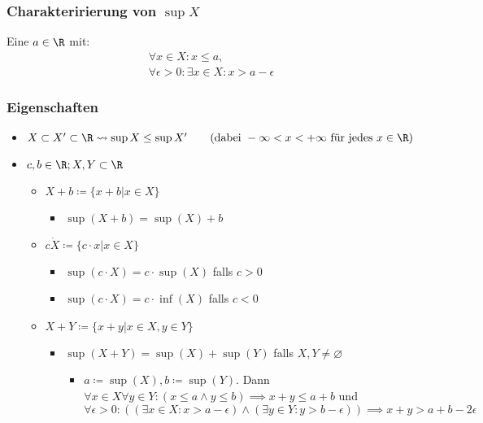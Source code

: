 \subsubsection{Charakteririerung von \texorpdfstring{$\sup X$}{sup X}}
Eine $a \in \R$ mit:\\
\begin{gather*}
	\forall x \in X : x \leq a, \\
	\forall \epsilon > 0 : \exists x \in X : x > a - \epsilon
\end{gather*}

\subsubsection{Eigenschaften}
\begin{itemize}
	\item $X \subset X' \subset \R \rightsquigarrow \sup X \leq \sup X' \qquad (\text{dabei } -\infty < x < +\infty \text{ für jedes } x \in \R )$
	\item $c, b \in \R ; X, Y \subset \R$
	\begin{itemize}
		\item $X + b \coloneqq \{ x + b | x \in X \}$
		\begin{itemize}
			\item $\sup(X + b) = \sup(X) + b$
		\end{itemize}
		\item $c \dot X \coloneqq \{ c \cdot x | x \in X \}$
		\begin{itemize}
			\item $\sup(c \cdot X) = c \cdot \sup(X)$ falls $c > 0$
			\item $\sup(c \cdot X) = c \cdot \inf(X)$ falls $c < 0$
		\end{itemize}
		\item $X + Y \coloneqq \{ x + y | x \in X , y \in Y \}$
		\begin{itemize}
			\item $\sup(X + Y) = \sup(X) + \sup(Y)$ falls $X, Y \neq \varnothing$
			\begin{itemize}
				\item $a \coloneqq \sup(X) , b \coloneqq \sup(Y)$. Dann\\
					$\forall x \in X \forall y \in Y : ( x \leq a \wedge y \leq b ) \implies x + y \leq a + b$ und \\
					$\forall \epsilon > 0 : (( \exists x \in X : x > a - \epsilon ) \wedge ( \exists y \in Y : y > b - \epsilon )) \implies x + y > a + b - 2 \epsilon$
			\end{itemize}
		\end{itemize}
	\end{itemize}
\end{itemize}
